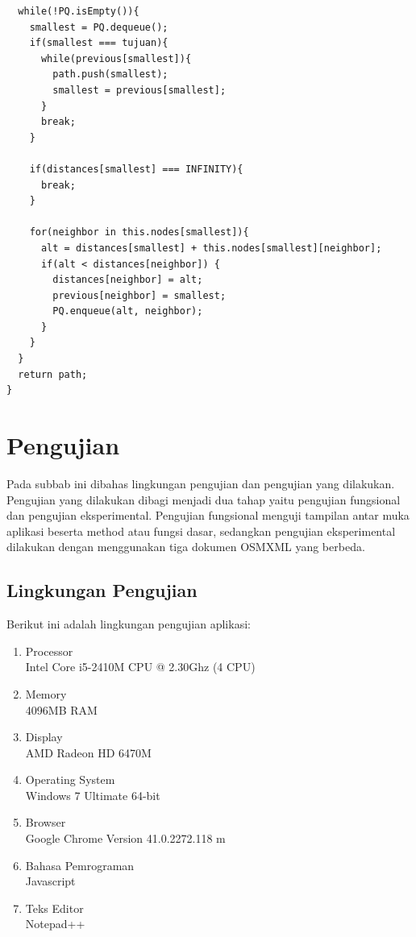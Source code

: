 \begin{itemize}
\begin{lstlisting}
  while(!PQ.isEmpty()){
    smallest = PQ.dequeue();
    if(smallest === tujuan){
      while(previous[smallest]){
        path.push(smallest);
        smallest = previous[smallest];
      }
      break;
    }
    
    if(distances[smallest] === INFINITY){
      break;
    }

    for(neighbor in this.nodes[smallest]){
      alt = distances[smallest] + this.nodes[smallest][neighbor];
      if(alt < distances[neighbor]) {
        distances[neighbor] = alt;
        previous[neighbor] = smallest;
        PQ.enqueue(alt, neighbor);
      }
    }
  }
  return path;
}
\end{lstlisting}
\end{itemize}

\section{Pengujian}
Pada subbab ini dibahas lingkungan pengujian dan pengujian yang dilakukan.
Pengujian yang dilakukan dibagi menjadi dua tahap yaitu pengujian fungsional 
dan pengujian eksperimental.
Pengujian fungsional menguji tampilan antar muka aplikasi beserta method atau
fungsi dasar, sedangkan pengujian eksperimental dilakukan dengan menggunakan
tiga dokumen OSMXML yang berbeda.

\subsection{Lingkungan Pengujian}
Berikut ini adalah lingkungan pengujian aplikasi:
\begin{enumerate}
  \item Processor\\
  Intel Core i5-2410M CPU @ 2.30Ghz (4 CPU)
  
  \item Memory\\
  4096MB RAM
  
  \item Display\\
  AMD Radeon HD 6470M
  
  \item Operating System\\
  Windows 7 Ultimate 64-bit
  
  \item Browser\\
  Google Chrome Version 41.0.2272.118 m 
  
  \item Bahasa Pemrograman\\
  Javascript
  
  \item Teks Editor\\
  Notepad++
\end{enumerate}

